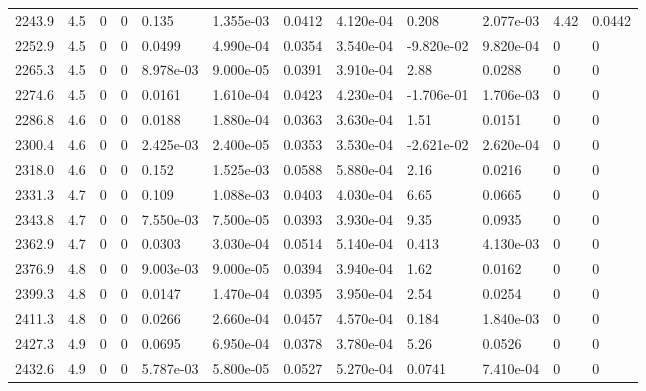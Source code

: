 \documentclass[preview]{standalone}
\begin{document}
{{{{{{\begin{tabular}{L{1.2cm}C{1.2cm} C{0.3cm}C{0.5cm} C{1.4cm}C{1.4cm} C{1.4cm}C{1.4cm} C{1.6cm}C{1.6cm} C{1.6cm}C{1.6cm}}
  2243.9  &   4.5  & 0     &  0 &  0.135  & 1.355e-03  &  0.0412&   4.120e-04& 0.208 & 2.077e-03   &  4.42 & 0.0442  \\ 
  2252.9  &   4.5  & 0     &  0 &  0.0499  & 4.990e-04  &  0.0354&   3.540e-04& -9.820e-02 & 9.820e-04   &  0 & 0  \\ 
  2265.3  &   4.5  & 0     &  0 &  8.978e-03  & 9.000e-05  &  0.0391&   3.910e-04& 2.88 & 0.0288   &  0 & 0  \\ 
  2274.6  &   4.5  & 0     &  0 &  0.0161  & 1.610e-04  &  0.0423&   4.230e-04& -1.706e-01 & 1.706e-03   &  0 & 0  \\ 
  2286.8  &   4.6  & 0     &  0 &  0.0188  & 1.880e-04  &  0.0363&   3.630e-04& 1.51 & 0.0151   &  0 & 0  \\ 
  2300.4  &   4.6  & 0     &  0 &  2.425e-03  & 2.400e-05  &  0.0353&   3.530e-04& -2.621e-02 & 2.620e-04   &  0 & 0  \\ 
  2318.0  &   4.6  & 0     &  0 &  0.152  & 1.525e-03  &  0.0588&   5.880e-04& 2.16 & 0.0216   &  0 & 0  \\ 
  2331.3  &   4.7  & 0     &  0 &  0.109  & 1.088e-03  &  0.0403&   4.030e-04& 6.65 & 0.0665   &  0 & 0  \\ 
  2343.8  &   4.7  & 0     &  0 &  7.550e-03  & 7.500e-05  &  0.0393&   3.930e-04& 9.35 & 0.0935   &  0 & 0  \\ 
  2362.9  &   4.7  & 0     &  0 &  0.0303  & 3.030e-04  &  0.0514&   5.140e-04& 0.413 & 4.130e-03   &  0 & 0  \\ 
  2376.9  &   4.8  & 0     &  0 &  9.003e-03  & 9.000e-05  &  0.0394&   3.940e-04& 1.62 & 0.0162   &  0 & 0  \\ 
  2399.3  &   4.8  & 0     &  0 &  0.0147  & 1.470e-04  &  0.0395&   3.950e-04& 2.54 & 0.0254   &  0 & 0  \\ 
  2411.3  &   4.8  & 0     &  0 &  0.0266  & 2.660e-04  &  0.0457&   4.570e-04& 0.184 & 1.840e-03   &  0 & 0  \\ 
  2427.3  &   4.9  & 0     &  0 &  0.0695  & 6.950e-04  &  0.0378&   3.780e-04& 5.26 & 0.0526   &  0 & 0  \\ 
  2432.6  &   4.9  & 0     &  0 &  5.787e-03  & 5.800e-05  &  0.0527&   5.270e-04& 0.0741 & 7.410e-04   &  0 & 0  \\ 
\hline 
\end{tabular} 

}}}}}}
\end{document}
